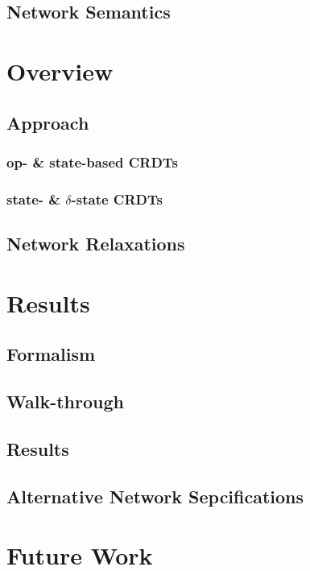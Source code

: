 \documentclass{thesis}
\begin{document}
  \section{Network Semantics}

  \chapter{Overview}
  \section{Approach}
  \subsection{op- \& state-based CRDTs}
  \subsection{state- \& $\delta$-state CRDTs}
  \section{Network Relaxations}

  \chapter{Results}
  \section{Formalism}
  \section{Walk-through}
  \section{Results}
  \section{Alternative Network Sepcifications}

  \chapter{Future Work}

  \newpage
  
\end{document}
